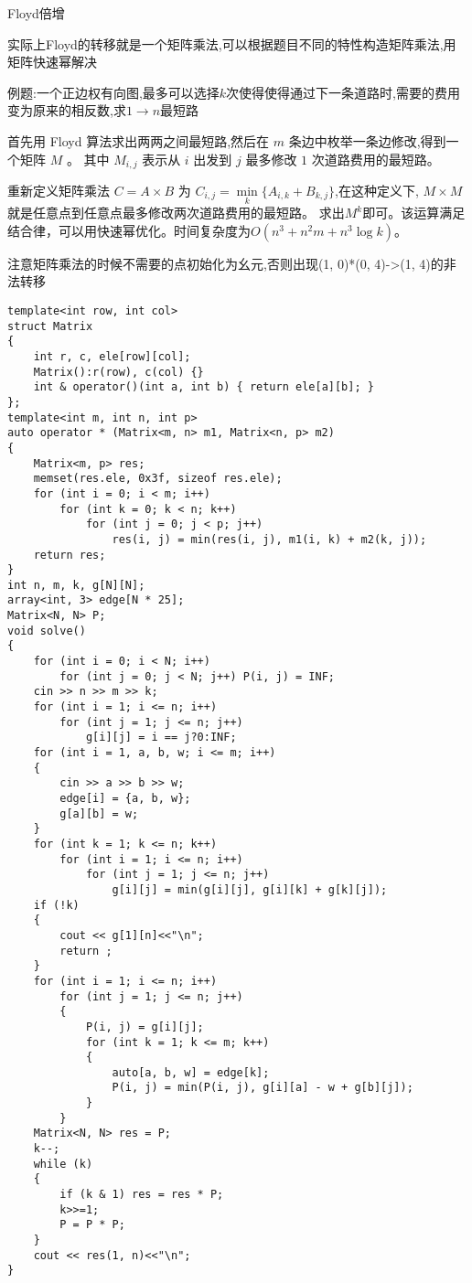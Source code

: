 \documentclass[a4paper, fontset=none]{ctexart}
\begin{document}
Floyd倍增

实际上Floyd的转移就是一个矩阵乘法,可以根据题目不同的特性构造矩阵乘法,用矩阵快速幂解决

例题:一个正边权有向图,最多可以选择$k$次使得使得通过下一条道路时,需要的费用变为原来的相反数,求$1\rightarrow n$最短路

首先用 Floyd 算法求出两两之间最短路,然后在 $m$ 条边中枚举一条边修改,得到一个矩阵 $M$ 。
其中 $M_{i, j}$ 表示从 $i$ 出发到 $j$ 最多修改 $1$ 次道路费用的最短路。

重新定义矩阵乘法 $C=A\times B$ 为 $C_{i, j}=\min\limits_k\{A_{i, k}+B_{k, j}\}$,在这种定义下,
$M\times M$ 就是任意点到任意点最多修改两次道路费用的最短路。
求出$M ^ k$即可。该运算满足结合律，可以用快速幂优化。时间复杂度为$O(n ^ 3+n ^ 2m+n ^ 3\log k)$。

注意矩阵乘法的时候不需要的点初始化为幺元,否则出现(1, 0)*(0, 4)->(1, 4)的非法转移

\begin{verbatim}
template<int row, int col>
struct Matrix
{
    int r, c, ele[row][col];
    Matrix():r(row), c(col) {}
    int & operator()(int a, int b) { return ele[a][b]; }
};
template<int m, int n, int p>
auto operator * (Matrix<m, n> m1, Matrix<n, p> m2)
{
    Matrix<m, p> res;
    memset(res.ele, 0x3f, sizeof res.ele);
    for (int i = 0; i < m; i++)
        for (int k = 0; k < n; k++)
            for (int j = 0; j < p; j++)
                res(i, j) = min(res(i, j), m1(i, k) + m2(k, j));
    return res;
}
int n, m, k, g[N][N];
array<int, 3> edge[N * 25];
Matrix<N, N> P;
void solve()
{
    for (int i = 0; i < N; i++)
        for (int j = 0; j < N; j++) P(i, j) = INF;
    cin >> n >> m >> k;
    for (int i = 1; i <= n; i++)
        for (int j = 1; j <= n; j++)
            g[i][j] = i == j?0:INF;
    for (int i = 1, a, b, w; i <= m; i++)
    {
        cin >> a >> b >> w;
        edge[i] = {a, b, w};
        g[a][b] = w;
    }
    for (int k = 1; k <= n; k++)
        for (int i = 1; i <= n; i++)
            for (int j = 1; j <= n; j++)
                g[i][j] = min(g[i][j], g[i][k] + g[k][j]);
    if (!k)
    {
        cout << g[1][n]<<"\n";
        return ;
    }
    for (int i = 1; i <= n; i++)
        for (int j = 1; j <= n; j++)
        {
            P(i, j) = g[i][j];
            for (int k = 1; k <= m; k++)
            {
                auto[a, b, w] = edge[k];
                P(i, j) = min(P(i, j), g[i][a] - w + g[b][j]);
            }
        }
    Matrix<N, N> res = P;
    k--;
    while (k)
    {
        if (k & 1) res = res * P;
        k>>=1;
        P = P * P;
    }
    cout << res(1, n)<<"\n";
}
\end{verbatim}
\end{document}

